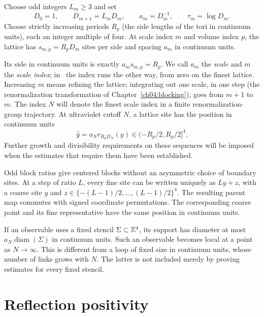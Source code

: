 \begin{definition}
\label{ch01:scales}
Choose odd integers $L_m\ge3$ and set
\begin{equation}
 D_0=1,\qquad D_{m+1}=L_mD_m,
 \qquad a_m=D_m^{-1},\qquad \tau_m=\log D_m.
 \label{ch01:scale-sequence}
\end{equation}
Choose strictly increasing periods $R_p$ (the side lengths of the tori in continuum units), each an integer multiple
of four. At scale index $m$ and volume index $p$, the lattice has
$s_{m,p}=R_pD_m$ sites per side and spacing $a_m$ in continuum units.
\end{definition}
Its side in continuum units is exactly $a_ms_{m,p}=R_p$. We call $a_m$ the \emph{scale} and $m$ the \emph{scale index}; in~\cite{Balaban1987RG} the index runs the other way, from zero on the finest lattice. Increasing $m$ means refining
the lattice; integrating out one scale, in one step (the renormalization transformation of Chapter~\ref{ch04:blocking}), goes from $m+1$ to $m$. The index
$N$ will denote the finest scale index in a finite renormalization-group trajectory.
At ultraviolet cutoff $N$, a lattice site has the position in continuum units
\begin{equation}
 \widehat y=a_N r_{R_pD_N}(y)\in(-R_p/2,R_p/2]^4.
 \label{ch01:placement}
\end{equation}
Further growth and divisibility requirements on these sequences will be
imposed when the estimates that require them have been established.

Odd block ratios give centered blocks without an asymmetric choice of
boundary sites. At a step of ratio $L$, every fine site can be written
uniquely as $Ly+z$, with a coarse site $y$ and
$z\in\{-(L-1)/2,\ldots,(L-1)/2\}^4$. The resulting parent map commutes
with signed coordinate permutations. The corresponding coarse point and
its fine representative have the same position in continuum units.

If an observable uses a fixed stencil $\Sigma\subset\mathbb Z^4$, its
support has diameter at most $a_N\operatorname{diam}(\Sigma)$ in continuum units. Such an
observable becomes local at a point as $N\to\infty$. This is different
from a loop of fixed size in continuum units, whose number of links grows with
$N$. The latter is not included merely by proving estimates for every
fixed stencil.

\section{Reflection positivity}
\label{ch01:reflection}

